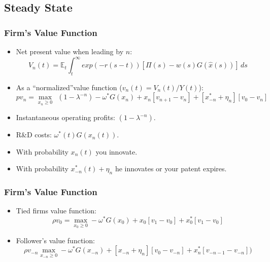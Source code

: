 \documentclass{beamer}
\begin{document}
\subsection{Steady State}
\label{sub:steady_state}
\begin{frame}[t]\frametitle{Firm's Value Function} 
  \begin{itemize}
    \item<+-> Net present value when leading by $n$:
      \begin{equation*}
        V_n(t) = \mathbb{E}_t \int_{t}^{\infty} exp(-r(s - t))[\Pi(s) - w(s)G(\hat{x}(s))]\,ds 
      \end{equation*}
    \item<+-> As a ``normalized''value function ($v_n(t) = V_n(t) / Y(t)$):
      \begin{equation*} \label{eq:rvf_leader}  %
          pv_n = \max_{x_n \geq 0}\ \ (1 - \lambda^{-n}) - \omega^*G(x_n) + x_n[v_{n+1} - v_n] + [x_{-n}^* + \eta_n][v_0 - v_n]
        \end{equation*}
    \item<+-> Instantaneous operating profits: $(1 - \lambda^{-n})$.
    \item<+-> R\&D costs: $\omega^*(t)G(x_n(t))$.
    \item<+-> With probability $x_n(t)$ you innovate.
    \item<+-> With probability $x_{-n}^*(t) + \eta_n$ he innovates or your patent expires.
  \end{itemize}
\end{frame}

\begin{frame}[t]\frametitle{Firm's Value Function} 
  \begin{itemize}
    \item<+-> Tied firms value function:
      \begin{equation*} \label{eq:rvf_tied}
        \rho v_0 = \max_{x_0 \geq 0} -\omega^*G(x_{0}) + x_{0}[v_1 - v_0] + x_0^*[v_{1} - v_0]
      \end{equation*}

    \item<+-> Follower's value function:
      \begin{equation*} \label{eq:rvf_follower}
        \rho v_{-n} \max_{x_{-n} \geq 0} -\omega^*G(x_{-n}) + [x_{-n} + \eta_n][v_0 - v_{-n}] + x_n^*[v_{-n-1} - v_{-n}])
      \end{equation*}
  \end{itemize}
\end{frame}
\end{document}
